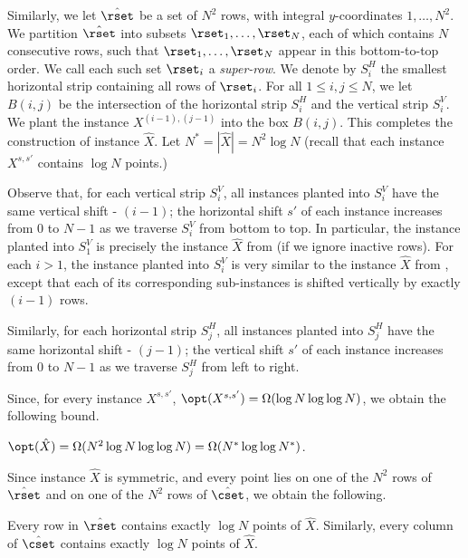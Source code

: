 Similarly, we let $\hat \rset$ be a set of $N^2$ rows, with integral $y$-coordinates $1,\ldots,N^2$. We partition $\hat \rset$ into subsets $\rset_1,\ldots,\rset_N$, each of which contains $N$ consecutive rows, such that $\rset_1,\ldots,\rset_N$ appear in this bottom-to-top order. We call each such set $\rset_i$ a \emph{super-row}.  We denote by $S^H_i$ the smallest horizontal strip containing all rows of $\rset_i$.
For all $1\leq i,j\leq N$, we let $B(i,j)$ be the intersection of the horizontal strip $S^H_i$ and the vertical strip $S^V_i$. We plant the instance $X^{(i-1),(j-1)}$ into the box $B(i,j)$. 
This completes the construction of instance $\hat{X}$. 
Let $N^* = |\hat{X}| = N^2 \log N$ (recall that  each instance $X^{s,s'}$ contains $\log N$ points.) 


Observe that, for each vertical strip $S^V_i$, all instances planted into $S^V_i$ have the same vertical shift - $(i-1)$; the horizontal shift $s'$ of each instance increases from $0$ to $N-1$ as we traverse $S^V_i$ from bottom to top. 
In particular, the instance planted into $S^V_1$ is precisely the instance $\hat X$ from  (if we ignore inactive rows).  
For each $i>1$, the instance planted into $S^V_i$ is very similar to the instance  $\hat X$ from , except that each of its corresponding sub-instances is shifted vertically by exactly $(i-1)$ rows.

Similarly, for each horizontal strip  $S^H_j$, all instances planted into $S^H_j$ have the same horizontal shift - $(j-1)$; the vertical shift $s'$ of each instance increases from $0$ to $N-1$ as we traverse $S^H_j$ from left to right.


Since, for every  instance $X^{s,s'}$, $\opt(X^{s,s'})=\Omega(\log N\log\log N)$, we obtain the following bound.
%
\begin{myobs} 
 $\opt(\hat X)=\Omega(N^2\log N\log\log N)=\Omega(N^*\log\log N^*)$. 
\end{myobs} 

Since instance $\hat X$ is symmetric, and every point lies on one of the $N^2$ rows of $\hat\rset$ and on one of the $N^2$ rows of $\hat\cset$, we obtain the following.

\begin{myobs} 
Every row in $\hat\rset$ contains exactly $\log N$ points of $\hat X$. Similarly, every column of $\hat\cset$  contains exactly $\log N$ points of $\hat X$.
\end{myobs} 


